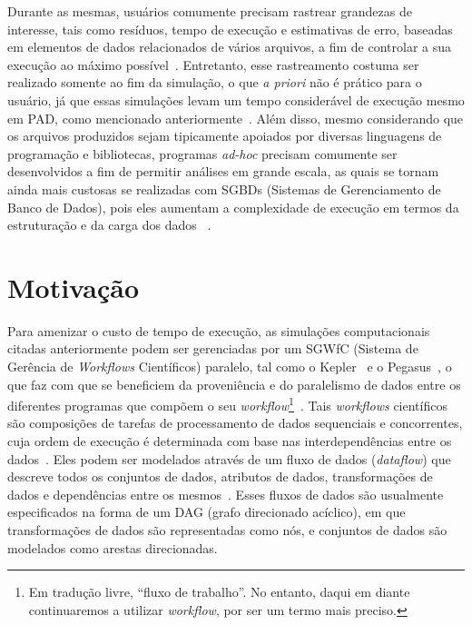 Durante as mesmas, usuários comumente precisam rastrear grandezas de interesse, tais como resíduos, tempo de execução e estimativas de erro, baseadas em elementos de dados relacionados de vários arquivos, a fim de controlar a sua execução ao máximo possível~\cite{silva2016situ}.
Entretanto, esse rastreamento costuma ser realizado somente ao fim da simulação, o que \textit{a priori} não é prático para o usuário, já que essas simulações levam um tempo considerável de execução mesmo em PAD, como mencionado anteriormente~\cite{silva2017raw}. Além disso, mesmo considerando que os arquivos produzidos sejam tipicamente apoiados por diversas linguagens de programação e bibliotecas, programas \textit{ad-hoc} precisam comumente ser desenvolvidos a fim de permitir análises em grande escala, as quais se tornam ainda mais custosas se realizadas com  SGBDs (Sistemas de Gerenciamento de Banco de Dados), pois eles aumentam a complexidade de execução em termos da estruturação e da carga dos dados ~\cite{silva2015analyzing}.

\section{Motivação}%
\label{sec:motivacao}

Para amenizar o custo de tempo de execução, as simulações computacionais citadas anteriormente podem ser gerenciadas por um  SGWfC (Sistema de Gerência de \textit{Workflows} Científicos) paralelo, tal como o Kepler~\cite{ludascher2006scientific} e o Pegasus~\cite{deelman2005pegasus}, o que faz com que se beneficiem da proveniência e do paralelismo de dados entre os diferentes programas que compõem o seu \textit{workflow}\footnote{Em tradução livre, ``fluxo de trabalho''. No entanto, daqui em diante continuaremos a utilizar \textit{workflow}, por ser um termo mais preciso.}~\cite{bux2013parallelization}.
Tais \textit{workflows} científicos são composições de tarefas de processamento de dados sequenciais e concorrentes, cuja ordem de execução é determinada com base nas interdependências entre os dados~\cite{bux2013parallelization}. Eles podem ser modelados através de um fluxo de dados (\textit{dataflow}) que descreve todos os conjuntos de dados, atributos de dados, transformações de dados e dependências entre os mesmos~\cite{silva2017raw}. Esses fluxos de dados são usualmente especificados na forma de um  DAG (grafo direcionado acíclico), em que transformações de dados são representadas como nós, e conjuntos de dados são modelados como arestas direcionadas.

